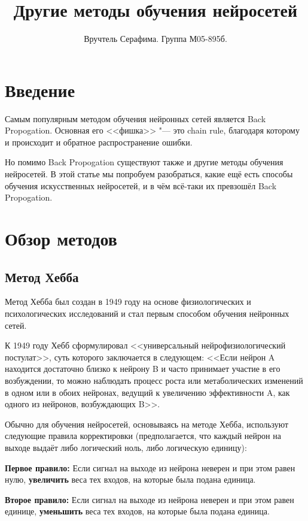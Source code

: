 \documentclass[a4paper,10pt]{article}
\title{Другие методы обучения нейросетей}
\author{Вручтель Серафима. Группа М05-895б.}
\theoremstyle{plain} %
\theoremstyle{definition} %
\theoremstyle{remark} %
\begin{document}

\maketitle

\section{Введение}

Самым популярным методом обучения нейронных сетей является Back Propogation. Основная его <<фишка>> "--- это chain rule, благодаря которому и происходит и обратное распространение ошибки.

Но помимо Back Propogation существуют также и другие методы обучения нейросетей. В этой статье мы попробуем разобраться, какие ещё есть способы обучения искусственных нейросетей, и в чём всё-таки их превзошёл Back Propogation.

\section{Обзор методов}

\subsection{Метод Хебба}

Метод Хебба был создан в 1949 году на основе физиологических и психологических исследований и стал первым способом обучения нейронных сетей.

К 1949 году Хебб сформулировал <<универсальный нейрофизиологический постулат>>, суть которого заключается в следующем: <<Если нейрон A находится достаточно близко к нейрону B и часто принимает участие в его возбуждении, то можно наблюдать процесс роста или метаболических изменений в одном или в обоих нейронах, ведущий к увеличению эффективности A, как одного из нейронов, возбуждающих B>>.

Обычно для обучения нейросетей, основываясь на методе Хебба, используют следующие правила корректировки (предполагается, что каждый нейрон на выходе выдаёт либо логический ноль, либо логическую единицу):

\textbf{Первое правило:} Если сигнал на выходе из нейрона неверен и при этом равен нулю, \textbf{увеличить} веса тех входов, на которые была подана единица.

\textbf{Второе правило:} Если сигнал на выходе из нейрона неверен и при этом равен единице, \textbf{уменьшить} веса тех входов, на которые была подана единица.
\end{document}

